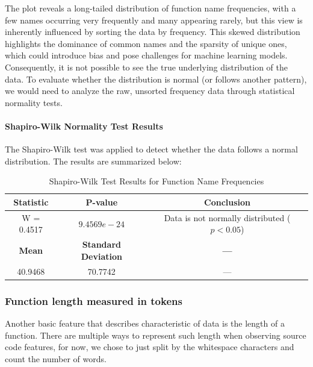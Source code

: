 \documentclass[10pt,english,a4paper]{report}
\begin{document}
The plot reveals a long-tailed distribution of function name frequencies, with a few names occurring very frequently and many appearing rarely, but this view is inherently influenced by sorting the data by frequency. This skewed distribution highlights the dominance of common names and the sparsity of unique ones, which could introduce bias and pose challenges for machine learning models. Consequently, it is not possible to see the true underlying distribution of the data. To evaluate whether the distribution is normal (or follows another pattern), we would need to analyze the raw, unsorted frequency data through statistical normality tests.

\paragraph{Shapiro-Wilk Normality Test Results}
The Shapiro-Wilk test was applied to detect whether the data follows a normal distribution. The results are summarized below:

\begin{table}[h!]
    \centering
    \caption{Shapiro-Wilk Test Results for Function Name Frequencies}
    \label{tab:shapiro_wilk_names}
    \begin{tabular}{|c|c|c|}
        \hline
        \textbf{Statistic} & \textbf{P-value} & \textbf{Conclusion} \\
        \hline
        W = 0.4517 & $9.4569e-24$ & Data is not normally distributed ($p < 0.05$) \\
        \hline
        \textbf{Mean} & \textbf{Standard Deviation} & \textbf{---} \\
        \hline
        40.9468 & 70.7742 & --- \\
        \hline
    \end{tabular}
\end{table}


\subsubsection{Function length measured in tokens}

Another basic feature that describes characteristic of data is the length of a function. There are multiple ways to represent such length when observing source code features, for now, we chose
to just split by the whitespace characters and count the number of words.
\end{document}
